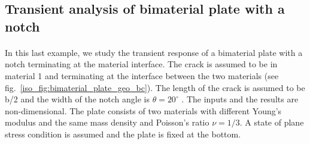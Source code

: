 \subsection{Transient analysis of bimaterial plate with a notch}

\paragraph{}
In this last example, we study the transient response of a bimaterial plate with a notch terminating at the material interface.
The crack is assumed to be in material 1 and terminating at the interface between the two materials (see fig.~\ref{iso_fig:bimaterial_plate_geo_bc}).
The length of the crack is assumed to be b/2 and the width of the notch angle is $\theta = 20^\circ$ .
The inputs and the results are non-dimensional.
The plate consists of two materials with different Young's modulus and the same mass density and Poisson's ratio $\nu = 1/3$.
A state of plane stress condition is assumed and the plate is fixed at the bottom.
